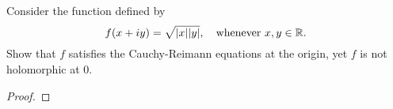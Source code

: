 \documentclass[../hw1]{subfiles}
\begin{document}
\begin{problem}
Consider the function defined by \[
	f(x+iy)=\sqrt{|x||y|},\quad \text{whenever } x,y \in \mathbb{R}
	.\]
Show that $f$ satisfies the Cauchy-Reimann equations at the origin, yet $f$ is not holomorphic at 0.
\end{problem}
\begin{proof}

\end{proof}
\end{document}
